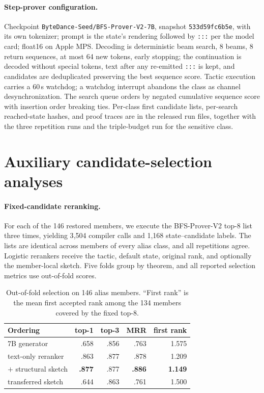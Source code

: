 \documentclass[11pt]{article}
\begin{document}
\paragraph{Step-prover configuration.}
Checkpoint \texttt{ByteDance-Seed/BFS-Prover-V2-7B}, snapshot
\texttt{533d59fc6b5e}, with its own tokenizer; prompt is the state's rendering
followed by \texttt{:::} per the model card; float16 on Apple MPS. Decoding is
deterministic beam search, 8 beams, 8 return sequences, at most 64 new tokens,
early stopping; the continuation is decoded without special tokens, text after
any re-emitted \texttt{:::} is kept, and candidates are deduplicated preserving
the best sequence score. Tactic execution carries a 60\,s watchdog; a watchdog
interrupt abandons the class as channel desynchronization. The search queue
orders by negated cumulative sequence score with insertion order breaking ties.
Per-class first candidate lists, per-search reached-state hashes, and proof
traces are in the released run files, together with the three repetition runs
and the triple-budget run for the sensitive class.

\section{Auxiliary candidate-selection analyses}
\label{app:rerank}

\paragraph{Fixed-candidate reranking.}
For each of the 146 restored members, we execute the BFS-Prover-V2 top-8 list
three times, yielding 3{,}504 compiler calls and 1{,}168 state--candidate
labels. The lists are identical across members of every alias class, and all
repetitions agree. Logistic rerankers receive the tactic, default state,
original rank, and optionally the member-local sketch. Five folds group by
theorem, and all reported selection metrics use out-of-fold scores.

\begin{table}[t]\centering\small
\setlength{\tabcolsep}{3.5pt}
\begin{tabular}{@{}lrrrr@{}}
\toprule
Ordering & top-1 & top-3 & MRR & first rank \\
\midrule
7B generator & .658 & .856 & .763 & 1.575 \\
text-only reranker & .863 & .877 & .878 & 1.209 \\
$+$ structural sketch & \textbf{.877} & .877 & \textbf{.886} & \textbf{1.149} \\
transferred sketch & .644 & .863 & .761 & 1.500 \\
\bottomrule
\end{tabular}
\caption{Out-of-fold selection on 146 alias members. ``First rank'' is the
mean first accepted rank among the 134 members covered by the fixed top-8.}
\label{tab:rerank}
\end{table}
\end{document}
